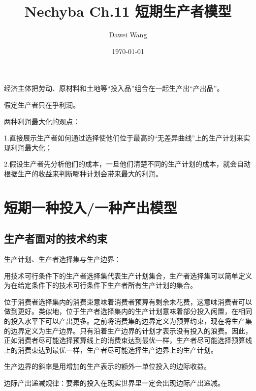 \documentclass{article}
\title{Nechyba Ch.11 短期生产者模型}
\author{Dawei Wang}
\date{\today}
\begin{document}
	\maketitle
经济主体把劳动、原材料和土地等“投入品”组合在一起生产出“产出品”。

假定生产者只在乎利润。

\hspace*{\fill}

两种利润最大化的观点：

1.直接展示生产者如何通过选择使他们位于最高的“无差异曲线”上的生产计划来实现利润最大化；

2.假设生产者先分析他们的成本，一旦他们清楚不同的生产计划的成本，就会自动根据生产的收益来判断哪种计划会带来最大的利润。

\section{短期一种投入/一种产出模型}
\subsection{生产者面对的技术约束}

生产计划、生产者选择集与生产边界：

用技术可行条件下的生产者选择集代表生产计划集合，生产者选择集可以简单定义为在给定条件下的技术可行条件下生产者所有生产计划的集合。

\hspace*{\fill}

位于消费者选择集内的消费束意味着消费者预算有剩余未花费，这意味消费者可以做到更好。类似地，位于生产者选择集内的生产计划意味着部分投入闲置，在相同的投入水平下可以产出更多。之前将消费集的边界定义为预算约束，现在将生产集的边界定义为生产边界。只有沿着生产边界的计划才表示没有投入的浪费。因此，正如消费者尽可能选择预算线上的消费束达到最优一样，生产者尽可能选择预算线上的消费束达到最优一样，生产者尽可能选择生产边界上的生产计划。

生产边界的斜率是用增加的生产表示的额外一单位投入的边际收益。

\hspace*{\fill}

边际产出递减规律：要素的投入在现实世界里一定会出现边际产出递减。
\end{document}
